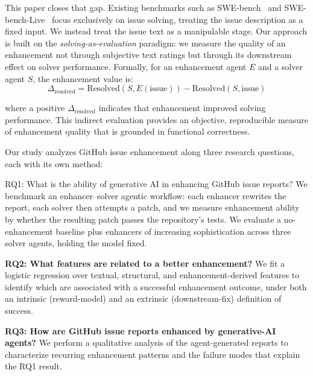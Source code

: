 \documentclass[journal]{IEEEtran}
\begin{document}
This paper closes that gap. Existing benchmarks such as SWE-bench~\cite{jimenez2024swebench} and SWE-bench-Live~\cite{zhang2025swebenchlive} focus exclusively on issue solving, treating the issue description as a fixed input. We instead treat the issue text as a manipulable stage. Our approach is built on the \emph{solving-as-evaluation} paradigm: we measure the quality of an enhancement not through subjective text ratings but through its downstream effect on solver performance. Formally, for an enhancement agent $E$ and a solver agent $S$, the enhancement value is:
\begin{equation}
\Delta_{\text{resolved}} = \text{Resolved}(S, E(\text{issue})) - \text{Resolved}(S, \text{issue})
\label{eq:enhancement_value}
\end{equation}

\noindent where a positive $\Delta_{\text{resolved}}$ indicates that enhancement improved solving performance. This indirect evaluation provides an objective, reproducible measure of enhancement quality that is grounded in functional correctness.

Our study analyzes GitHub issue enhancement along three research questions, each with its own method:

RQ1: What is the ability of generative AI in enhancing GitHub issue reports? We benchmark an enhancer--solver agentic workflow: each enhancer rewrites the report, each solver then attempts a patch, and we measure enhancement ability by whether the resulting patch passes the repository's tests. We evaluate a no-enhancement baseline plus enhancers of increasing sophistication across three solver agents, holding the model fixed.

\textbf{RQ2: What features are related to a better enhancement?} We fit a logistic regression over textual, structural, and enhancement-derived features to identify which are associated with a successful enhancement outcome, under both an intrinsic (reward-model) and an extrinsic (downstream-fix) definition of success.

\textbf{RQ3: How are GitHub issue reports enhanced by generative-AI agents?} We perform a qualitative analysis of the agent-generated reports to characterize recurring enhancement patterns and the failure modes that explain the RQ1 result.
\end{document}
